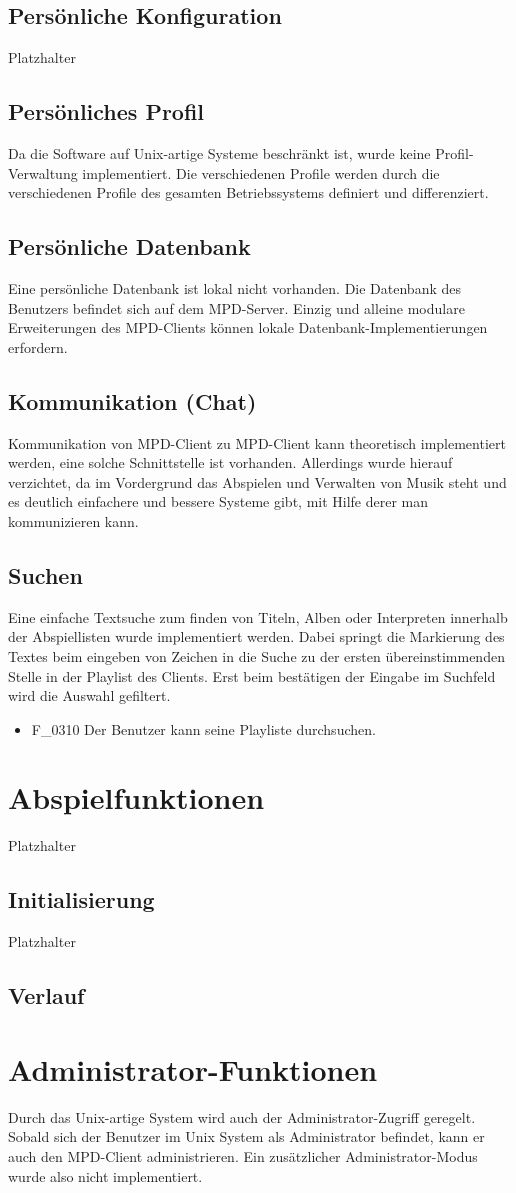 \subsection{Persönliche Konfiguration}
Platzhalter
\subsection{Persönliches Profil}
Da die Software auf Unix-artige Systeme beschränkt ist, wurde keine Profil-Verwaltung implementiert. Die
verschiedenen Profile werden durch die verschiedenen Profile des gesamten Betriebssystems definiert und differenziert.
\subsection{Persönliche Datenbank}
Eine persönliche Datenbank ist lokal nicht vorhanden. Die Datenbank des Benutzers befindet sich auf dem MPD-Server.
Einzig und alleine modulare Erweiterungen des MPD-Clients können lokale Datenbank-Implementierungen erfordern.
\subsection{Kommunikation (Chat)}
Kommunikation von MPD-Client zu MPD-Client kann theoretisch implementiert werden, eine solche Schnittstelle ist vorhanden.
Allerdings wurde hierauf verzichtet, da im Vordergrund das Abspielen und Verwalten von Musik steht und es deutlich
einfachere und bessere Systeme gibt, mit Hilfe derer man kommunizieren kann.
\subsection{Suchen}
Eine einfache Textsuche zum finden von Titeln, Alben oder Interpreten innerhalb der Abspiellisten wurde implementiert
werden. Dabei springt die Markierung des Textes beim eingeben von Zeichen in die Suche zu der ersten übereinstimmenden
Stelle in der Playlist des Clients. Erst beim bestätigen der Eingabe im Suchfeld wird die Auswahl gefiltert.
\begin{itemize}
        \item F\_0310 Der Benutzer kann seine Playliste durchsuchen.
\end{itemize}
\section{Abspielfunktionen}
Platzhalter
\subsection{Initialisierung}
Platzhalter
\subsection{Verlauf}
\section{Administrator-Funktionen}
Durch das Unix-artige System wird auch der Administrator-Zugriff geregelt. Sobald sich der Benutzer im Unix System
als Administrator befindet, kann er auch den MPD-Client administrieren. Ein zusätzlicher Administrator-Modus wurde also
nicht implementiert.
